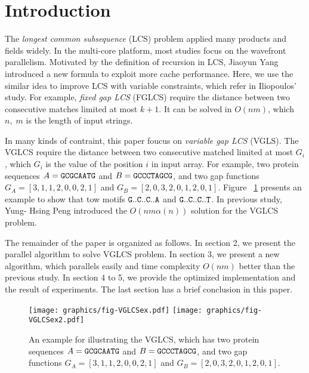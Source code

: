 \section{Introduction} %
\label{sec:Introduction}

The \emph{longest common subsequence} (LCS) problem applied many
products and fields widely.  In the multi-core platform, most studies
focus on the wavefront parallelism. Motivated by the definition of
recursion in LCS, Jiaoyun Yang introduced a new formula to exploit
more cache performance.  Here, we use the similar idea to improve LCS
with variable constraints, which refer in Iliopoulos' study.  For
example, \emph{fixed gap LCS} (FGLCS) require the distance between two
consecutive matches limited at most $k+1$.  It can be solved in
$O(nm)$, which $n, \; m$ is the length of input strings.

In many kinds of contraint, this paper foucus on \emph{variable gap
LCS} (VGLS). The VGLCS require the distance between two consecutive
matched limited at most $G_i$, which $G_i$ is the value of the
position $i$ in input array. For example, two protein sequences $A =
\tt{GCGCAATG}$ and $B = \tt{GCCCTAGCG}$, and two gap functions $G_A =
[3, 1, 1, 2, 0, 0, 2, 1]$ and $G_B = [2, 0, 3, 2, 0, 1, 2, 0, 1]$.
Figure ~\ref{fig:VGLCSex} presents an example to show that tow motifs
$\tt{G..C..C..A}$ and $\tt{G..C..C..T}$.  In previous study, Yung-
Hsing Peng \cite{Yang2010AnEP} introduced the $O(nm \alpha(n))$
solution for the VGLCS problem.

The remainder of the paper is organized as follows. In section 2, we
present the parallel algorithm to solve VGLCS problem. In section 3,
we present a new algorithm, which parallels easily and time complexity
$O(nm)$ better than the previous study. In section 4 to 5, we provide
the optimized implementation and the result of experiments. The last
section has a brief conclusion in this paper.

\begin{figure}[!thb]
  \centering
  \texttt{[image: graphics/fig-VGLCSex.pdf]}
  \texttt{[image: graphics/fig-VGLCSex2.pdf]}

  \caption{   An example for illustrating the VGLCS, which has two
protein sequences $A = \tt{GCGCAATG}$ and $B = \tt{GCCCTAGCG}$, and
two gap functions $G_A = [3, 1, 1, 2, 0, 0, 2, 1]$ and $G_B = [2, 0,
3, 2, 0, 1, 2, 0, 1]$.   }
  
  \label{fig:VGLCSex}
\end{figure}